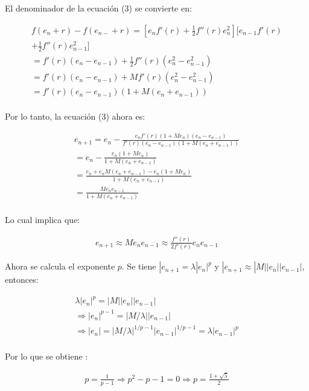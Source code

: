 \documentclass[10pt,technote]{IEEEtran}
\begin{document}
El denominador de la ecuación (3) se convierte en:


\begin{gather*}
    f(e_n +r)-f(e_{n-} +r)= [e_nf'(r)+\frac{1}{2}f''(r)e^{2}_n][e_{n-1}f'(r) \\
    +\frac{1}{2}f''(r)e^{2}_{n-1}] \\
    = f'(r)(e_n-e_{n-1})+\frac{1}{2}f''(r)(e^{2}_n -e^{2}_{n-1}) \\
    = f'(r)(e_n-e_{n-1})+Mf'(r)(e^{2}_n -e^{2}_{n-1}) \\
    = f'(r)(e_n-e_{n-1})(1+M(e_n +e_{n-1})) \\
\end{gather*}


Por lo tanto, la ecuación (3) ahora es:


\begin{gather*}
    e_{n+1}= e_{n} - \frac{e_nf'(r)(1+Me_n)(e_n -e_{n-1})}{f'(r)(e_n-e_{n-1})(1+M(e_n +e_{n-1}))} \\
    = e_{n} - \frac{e_n(1+Me_n)}{1+M(e_n+e_{n-1})} \\
    = \frac{e_n+e_n M(e_n+e_{n-1})-e_n(1+Me_n)}{1+M(e_n+e_{n-1})} \\
    = \frac{M e_n e_{n-1}}{1+M(e_n+e_{n-1})} \\
\end{gather*}


Lo cual implica que:

\begin{gather*}
    e_{n+1} \approx M e_n e_{n-1} \approx \frac{f''(r)}{2f'(r)} e_n e_{n-1}
\end{gather*}

Ahora se calcula el exponente $p$. Se tiene $|e_{n+1}= \lambda|e_n|^{p}$ y $|e_{n+1} \approx |M||e_n||e_{n-1}|$, entonces:

\begin{gather*}
    \lambda|e_n|^{p}=|M||e_n||e_{n-1}| \\
    \Rightarrow |e_n|^{p-1}=|M/\lambda||e_{n-1}| \\
    \Rightarrow |e_n|=|M/\lambda|^{1/{p-1}}|e_{n-1}|^{1/{p-1}}= \lambda|e_{n-1}|^{p} \\
\end{gather*} 

Por lo que se obtiene \cite{b1}:

\begin{gather*}
    p=\frac{1}{p-1} \Rightarrow p^{2}-p-1=0 \Rightarrow p = \frac{1+ \sqrt{5}}{2}
\end{gather*} 
\end{document}
